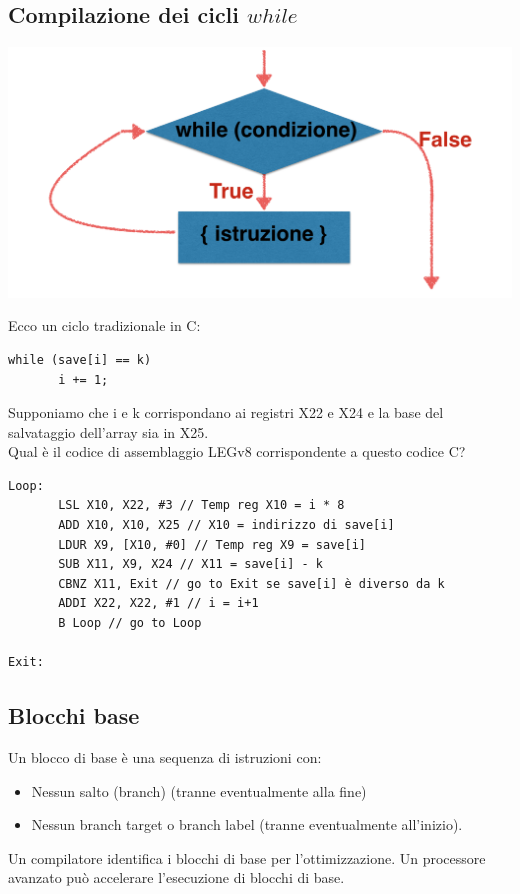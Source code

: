\documentclass[12pt,a4paper]{article}
\begin{document}
\subsection{Compilazione dei cicli $while$}
\begin{center}
\includegraphics[width=0.7\columnwidth]{img/while.png}
\end{center}
Ecco un ciclo tradizionale in C:
\begin{center}
\begin{minipage}{.4\linewidth}
\begin{verbatim}
while (save[i] == k)
       i += 1;
\end{verbatim}
\end{minipage}
\end{center}
Supponiamo che i e k corrispondano ai registri X22 e X24 e la base del salvataggio dell'array sia in X25.\\
Qual è il codice di assemblaggio LEGv8 corrispondente a questo codice C?
\begin{verbatim}
Loop:
       LSL X10, X22, #3 // Temp reg X10 = i * 8
       ADD X10, X10, X25 // X10 = indirizzo di save[i]
       LDUR X9, [X10, #0] // Temp reg X9 = save[i]
       SUB X11, X9, X24 // X11 = save[i] - k
       CBNZ X11, Exit // go to Exit se save[i] è diverso da k
       ADDI X22, X22, #1 // i = i+1
       B Loop // go to Loop

Exit:
\end{verbatim}

\subsection{Blocchi base}
Un blocco di base è una sequenza di istruzioni con:
\begin{itemize}
\item Nessun salto (branch) (tranne eventualmente alla fine) 
\item Nessun branch target o branch label (tranne eventualmente all'inizio).
\end{itemize}
Un compilatore identifica i blocchi di base per l'ottimizzazione. Un processore avanzato può accelerare l'esecuzione di blocchi di base.
\end{document}

